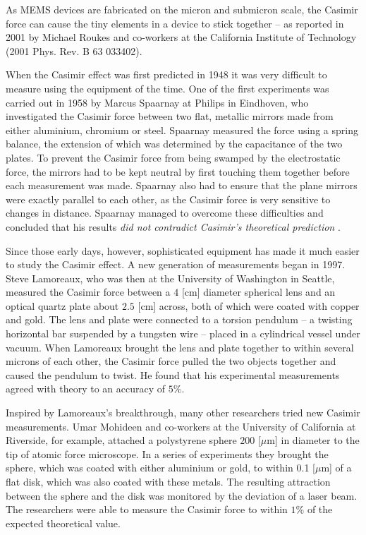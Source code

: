 	As MEMS devices are fabricated on the micron and submicron scale, the Casimir force can cause the tiny elements in a device to stick together – as reported in 2001 by Michael Roukes and co-workers at the California Institute of Technology (2001 Phys. Rev. B 63 033402). 
	
	When the Casimir effect was first predicted in 1948 it was very difficult to measure using the equipment of the time. One of the first experiments was carried out in 1958 by Marcus Spaarnay at Philips in Eindhoven, who investigated the Casimir force between two flat, metallic mirrors made from either aluminium, chromium or steel. Spaarnay measured the force using a spring balance, the extension of which was determined by the capacitance of the two plates. To prevent the Casimir force from being swamped by the electrostatic force, the mirrors had to be kept neutral by first touching them together before each measurement was made. Spaarnay also had to ensure that the plane mirrors were exactly parallel to each other, as the Casimir force is very sensitive to changes in distance. Spaarnay managed to overcome these difficulties and concluded that his results \og \textit{did not contradict Casimir’s theoretical prediction} \fg{}.

	Since those early days, however, sophisticated equipment has made it much easier to study the Casimir effect. A new generation of measurements began in 1997. Steve Lamoreaux, who was then at the University of Washington in Seattle, measured the Casimir force between a $4$ [cm] diameter spherical lens and an optical quartz plate about $2.5$ [cm] across, both of which were coated with copper and gold. The lens and plate were connected to a torsion pendulum – a twisting horizontal bar suspended by a tungsten wire – placed in a cylindrical vessel under vacuum. When Lamoreaux brought the lens and plate together to within several microns of each other, the Casimir force pulled the two objects together and caused the pendulum to twist. He found that his experimental measurements agreed with theory to an accuracy of $5\%$.
	
	Inspired by Lamoreaux’s breakthrough, many other researchers tried new Casimir measurements. Umar Mohideen and co-workers at the University of California at Riverside, for example, attached a polystyrene sphere $200$ [$\mu$m] in diameter to the tip of atomic force microscope. In a series of experiments they brought the sphere, which was coated with either aluminium or gold, to within 0.1 [$\mu$m] of a flat disk, which was also coated with these metals. The resulting attraction between the sphere and the disk was monitored by the deviation of a laser beam. The researchers were able to measure the Casimir force to within $1\%$ of the expected theoretical value.
	
